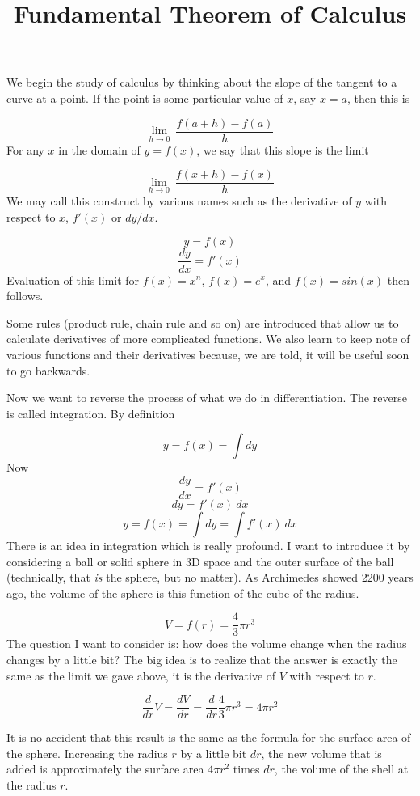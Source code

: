 \documentclass[11pt, oneside]{article}   	%
\title{Fundamental Theorem of Calculus}
\date{}							%
\begin{document}
\maketitle
\Large

We begin the study of calculus by thinking about the slope of the tangent to a curve at a point.  If the point is some particular value of $x$, say $x=a$, then this is

\[ \lim_{h \rightarrow 0} \ \frac{f(a + h) - f(a)}{h} \]
For any $x$ in the domain of $y=f(x)$, we say that this slope is the limit

\[ \lim_{h \rightarrow 0} \ \frac{f(x + h) - f(x)}{h} \]
We may call this construct by various names such as the derivative of $y$ with respect to $x$, $f'(x)$ or $dy/dx$.  

\[ y = f(x) \]
\[ \frac{dy}{dx} = f'(x) \]
Evaluation of this limit for $f(x) = x^n$, $f(x) = e^x$, and $f(x) = sin(x)$ then follows.  

Some rules (product rule, chain rule and so on) are introduced that allow us to calculate derivatives of more complicated functions.  We also learn to keep note of various functions and their derivatives because, we are told, it will be useful soon to go backwards.

Now we want to reverse the process of what we do in differentiation.  The reverse is called integration.  By definition

\[ y = f(x) = \int dy \]
Now
\[ \frac{dy}{dx} = f'(x) \]
\[ dy = f'(x) \ dx \]
\[ y = f(x) = \int dy = \int f'(x) \ dx \]
There is an idea in integration which is really profound.  I want to introduce it by considering a ball or solid sphere in 3D space and the outer surface of the ball (technically, that \emph{is} the sphere, but no matter).  As Archimedes showed 2200 years ago, the volume of the sphere is this function of the cube of the radius.

\[ V = f(r) = \frac{4}{3} \pi r^3 \]
The question I want to consider is:  how does the volume change when the radius changes by a little bit?  The big idea is to realize that the answer is exactly the same as the limit we gave above, it is the derivative of $V$ with respect to $r$.

\[ \frac{d}{dr} V = \frac{dV}{dr} = \frac{d}{dr} \frac{4}{3} \pi r^3 = 4 \pi r^2  \]

It is no accident that this result is the same as the formula for the surface area of the sphere.  Increasing the radius $r$ by a little bit $dr$, the new volume that is added is approximately the surface area $4\pi r^2$ times $dr$, the volume of the shell at the radius $r$.
\end{document}

